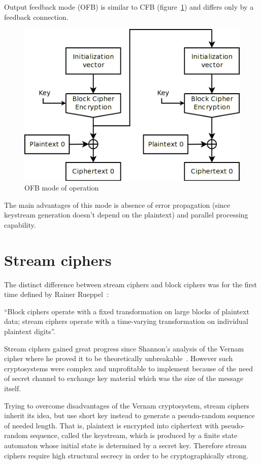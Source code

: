 Output feedback mode (OFB) is similar to CFB (figure~\ref{fig:mode-ofb}) and
differs only by a feedback connection.
\begin{figure}[htbp]
	\centering
	\includegraphics[scale=0.6]{images/modes_ofb}
	\caption{OFB mode of operation}
	\label{fig:mode-ofb}
\end{figure}
The main advantages of this mode is
absence of error propagation (since keystream generation doesn't depend on the
plaintext) and parallel processing capability.

\section{Stream ciphers}

The distinct difference between stream ciphers and block ciphers was for the
first time defined by Rainer Rueppel~\cite{robshaw:rsa:streamciphers}: 

``Block ciphers operate with a fixed transformation on large blocks of
plaintext data; stream ciphers operate with a time-varying transformation on
individual plaintext digits''.

Stream ciphers gained great progress since Shannon's analysis of the 
Vernam cipher where he proved it to be theoretically
unbreakable~\cite{shannon:secrecy}. However such cryptosystems were complex and
unprofitable to implement because of the need of secret channel to exchange key
material which was the size of the message itself.

Trying to overcome disadvantages of the Vernam cryptosystem, stream ciphers
inherit its idea, but use short key instead to generate a pseudo-random sequence
of needed length. That is, plaintext is encrypted into ciphertext with
pseudo-random sequence,  called the keystream, which is produced by a finite
state automaton whose initial state is determined by a secret key. Therefore
stream ciphers require high structural secrecy in order to be cryptographically
strong.

